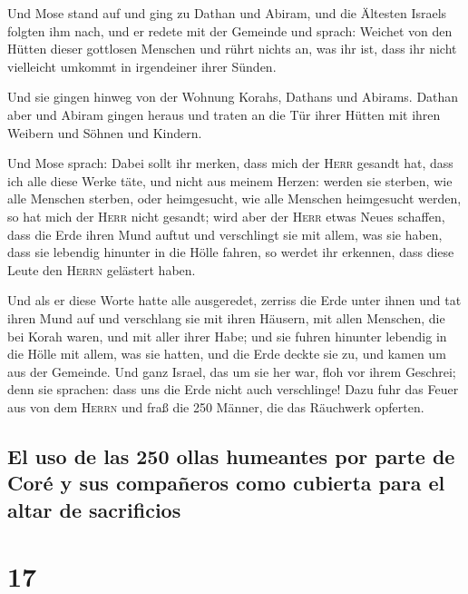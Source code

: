  Und Mose stand auf und ging zu Dathan und Abiram, und
die Ältesten Israels folgten ihm nach,  und er redete mit
der Gemeinde und sprach: Weichet von den Hütten dieser gottlosen
Menschen und rührt nichts an, was ihr ist, dass ihr nicht vielleicht
umkommt in irgendeiner ihrer Sünden.

 Und sie gingen hinweg von der Wohnung Korahs, Dathans
und Abirams. Dathan aber und Abiram gingen heraus und traten an die Tür
ihrer Hütten mit ihren Weibern und Söhnen und Kindern.

 Und Mose sprach: Dabei sollt ihr merken, dass mich der
\textsc{Herr} gesandt hat, dass ich alle diese Werke täte, und nicht aus
meinem Herzen:  werden sie sterben, wie alle Menschen
sterben, oder heimgesucht, wie alle Menschen heimgesucht werden, so hat
mich der \textsc{Herr} nicht gesandt;  wird aber der
\textsc{Herr} etwas Neues schaffen, dass die Erde ihren Mund auftut und
verschlingt sie mit allem, was sie haben, dass sie lebendig hinunter in
die Hölle fahren, so werdet ihr erkennen, dass diese Leute den
\textsc{Herrn} gelästert haben.

 Und als er diese Worte hatte alle ausgeredet, zerriss
die Erde unter ihnen  und tat ihren Mund auf und
verschlang sie mit ihren Häusern, mit allen Menschen, die bei Korah
waren, und mit aller ihrer Habe;  und sie fuhren hinunter
lebendig in die Hölle mit allem, was sie hatten, und die Erde deckte sie
zu, und kamen um aus der Gemeinde.  Und ganz Israel, das
um sie her war, floh vor ihrem Geschrei; denn sie sprachen: dass uns die
Erde nicht auch verschlinge!  Dazu fuhr das Feuer aus von
dem \textsc{Herrn} und fraß die 250 Männer, die das Räuchwerk opferten.

\hypertarget{el-uso-de-las-250-ollas-humeantes-por-parte-de-coruxe9-y-sus-compauxf1eros-como-cubierta-para-el-altar-de-sacrificios}{%
\subsection{El uso de las 250 ollas humeantes por parte de Coré y sus
compañeros como cubierta para el altar de
sacrificios}\label{el-uso-de-las-250-ollas-humeantes-por-parte-de-coruxe9-y-sus-compauxf1eros-como-cubierta-para-el-altar-de-sacrificios}}

\hypertarget{section-16}{%
\section{17}\label{section-16}}

